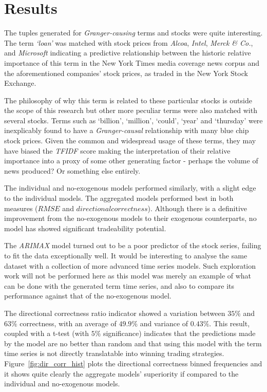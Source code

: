 \documentclass[conference,11pt]{IEEEtran}
\begin{document}
\section{Results}
The tuples generated for \textit{Granger-causing} terms and stocks were quite interesting. The term \textit{`loan'} was matched with stock prices from \textit{Alcoa}, \textit{Intel}, \textit{Merck \& Co.}, and \textit{Microsoft} indicating a predictive relationship between the historic relative importance of this term in the New York Times media coverage news corpus and the aforementioned companies' stock prices, as traded in the New York Stock Exchange.

\par
The philosophy of why this term is related to these particular stocks is outside the scope of this research but other more peculiar terms were also matched with several stocks. Terms such as `billion', `million', `could', `year' and `thursday'  were inexplicably found to have a \textit{Granger-causal} relationship with many blue chip stock prices. Given the common and widespread usage of these terms, they may have biased the \textit{TFIDF} score making the interpretation of their relative importance into a proxy of some other generating factor - perhaps the volume of news produced? Or something else entirely.

\par
The individual and no-exogenous models performed similarly, with a slight edge to the individual models. The aggregated models performed best in both measures (\(RMSE\) and \(directional correctness\)). Although there is a definitive improvement from the no-exogenous models to their exogenous counterparts, no model has showed significant tradeability potential.

\par
The \textit{ARIMAX} model turned out to be a poor predictor of the stock series, failing to fit the data exceptionally well. It would be interesting to analyse the same dataset with a collection of more advanced time series models. Such exploration work will not be performed here as this model was merely an example of what can be done with the generated term time series, and also to compare its performance against that of the no-exogenous model.

\par
The directional correctness ratio indicator showed a variation between \(35\%\) and \(63\%\) correctness, with an average of \(49.9\%\) and variance of \(0.43\%\). This result, coupled with a  t-test (with \(5\%\) significance) indicates that the predictions made by the model are no better than random and that using this model with the term time series is not directly translatable into winning trading strategies. Figure~\ref{fig:dir_corr_hist} plots the directional correctness binned frequencies and it shows quite clearly the aggregate models' superiority if compared to the individual and no-exogenous models.
\end{document}
